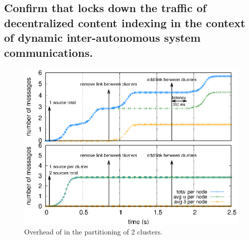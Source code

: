 \subsection{Confirm that \NAME locks down the traffic of decentralized content
  indexing in the context of dynamic inter-autonomous system
  communications.}

\begin{figure}
  \centering\includegraphics[width=0.99\columnwidth]{img/as_cast_geant.eps}
  \caption{\label{fig:geant}Overhead of \NAME in the partitioning of 2 clusters.}
\end{figure}

